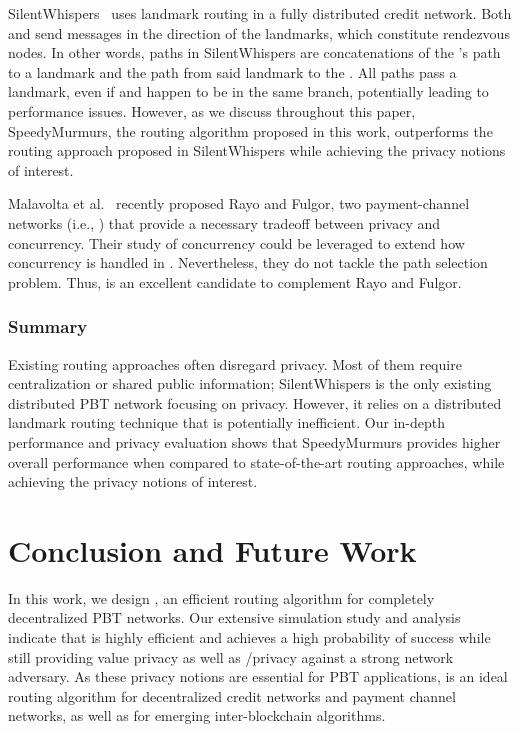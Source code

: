 SilentWhispers~\cite{malavolta17silent} uses landmark routing in a fully distributed credit network. 
Both \sender and \receiver send messages in the direction of the landmarks, 
which constitute rendezvous nodes. In other words, 
paths in SilentWhispers are concatenations of the \sender's path to a landmark and the path 
from said landmark to the \receiver. 
All paths pass a landmark, even if \sender and \receiver happen to be in the same branch, potentially leading to performance issues. However, as we discuss throughout this paper, SpeedyMurmurs, the routing 
algorithm proposed in this work, outperforms the routing approach proposed in SilentWhispers while 
achieving the privacy notions of interest.

Malavolta et al.~\cite{malavolta17PCN}
recently proposed Rayo and Fulgor, two payment-channel 
networks (i.e., \paysyss) 
that provide a necessary tradeoff between privacy and concurrency. Their  
study of concurrency could be leveraged to extend how 
concurrency is handled in \oursys. Nevertheless, they
do not tackle the path selection problem. Thus, 
\oursys is an excellent candidate to complement Rayo and Fulgor. 

\subsubsection*{Summary} Existing routing approaches often disregard privacy. Most of them require centralization or shared public information; SilentWhispers is the only existing distributed PBT network focusing on privacy. However, it relies on a distributed landmark routing technique that is potentially inefficient. Our in-depth performance and privacy evaluation 
shows that SpeedyMurmurs provides higher overall 
performance 
when compared to state-of-the-art routing approaches, while 
achieving the privacy notions of interest.
\section{Conclusion and Future Work}
\label{sec:conc}

In this work, we design \oursys, an efficient routing algorithm for completely decentralized PBT networks.
Our extensive simulation study and analysis indicate that \oursys is highly efficient and achieves a high probability of success
while still providing value privacy as well as \sender/\receiver privacy against a strong network adversary.
As these privacy notions are essential for PBT applications,
\oursys is an ideal routing algorithm for decentralized credit networks and payment channel networks, as well as for emerging inter-blockchain algorithms.


